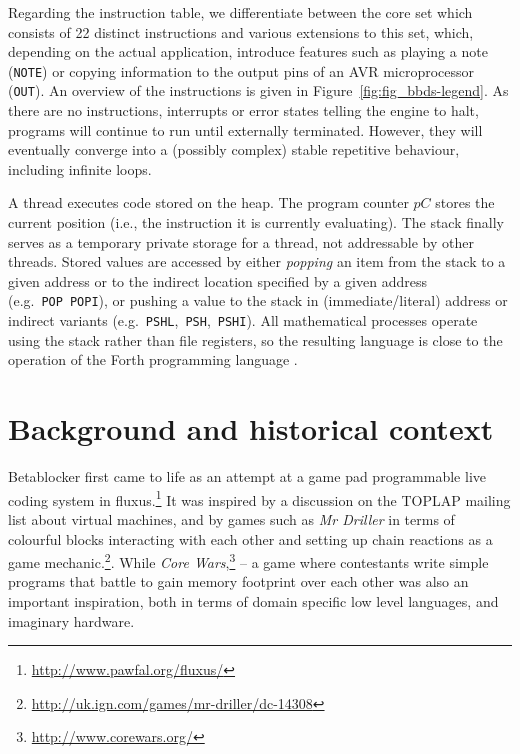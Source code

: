 \documentclass[letterpaper, 12pt]{article}
\begin{document}
Regarding the instruction table, we differentiate between the core set which consists of 22 distinct instructions and various extensions to this set, which, depending on the actual application, introduce features such as playing a note (\texttt{NOTE}) or copying information to the output pins of an AVR microprocessor (\texttt{OUT}).
An overview of the instructions is given in Figure~\ref{fig:fig_bbds-legend}.
As there are no instructions, interrupts or error states telling the engine to halt, programs will continue to run until externally terminated.
However, they will eventually converge into a (possibly complex) stable repetitive behaviour, including infinite loops.

A thread executes code stored on the heap.
The program counter $pC$ stores the current position (i.e., the instruction it is currently evaluating).
The stack finally serves as a temporary private storage for a thread, not addressable by other threads.
Stored values are accessed by either \emph{popping} an item from the stack to a given address or to the indirect location specified by a given address (e.g.~\texttt{POP}~\texttt{POPI}), or pushing a value to the stack in (immediate/literal) address or indirect variants  (e.g.~\texttt{PSHL},~\texttt{PSH},~\texttt{PSHI}). All mathematical processes operate using the stack rather than file registers, so the resulting language is close to the operation of the Forth programming language \citep{rather1993-the}.
\parskip 18pt

\section{Background and historical context}
\label{sec:background}


Betablocker first came to life as an attempt at a game pad programmable live coding system in fluxus.\footnote{
\url{http://www.pawfal.org/fluxus/}
}
It was inspired by a discussion on the TOPLAP mailing list about virtual machines, and by games such as \emph{Mr Driller} in terms of colourful blocks interacting with each other and setting up chain reactions as a game mechanic.\footnote{
\url{http://uk.ign.com/games/mr-driller/dc-14308}
}. While
\emph{Core Wars},\footnote{
\url{http://www.corewars.org/}
} -- a game where contestants write simple programs that battle to gain memory footprint over each other was also an important inspiration, both in terms of domain specific low level languages, and imaginary hardware.
\end{document}
